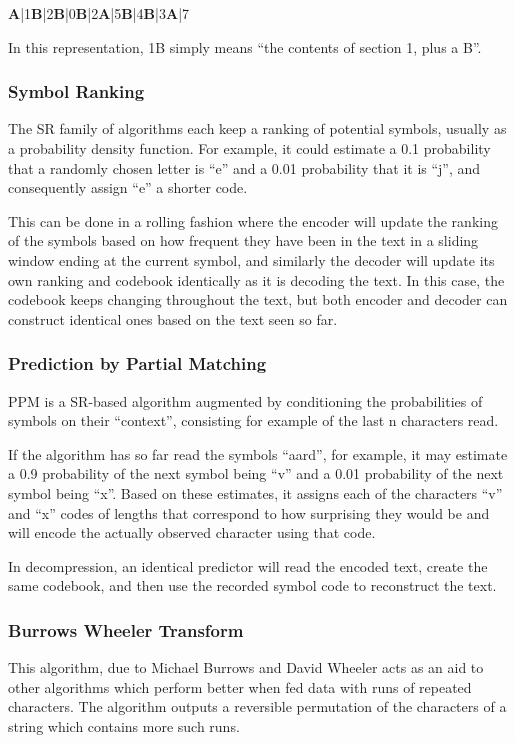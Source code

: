 \begin{center}
\textbf{A}|1\textbf{B}|2\textbf{B}|0\textbf{B}|2\textbf{A}|5\textbf{B}|4\textbf{B}|3\textbf{A}|7
\end{center}

In this representation, 1B simply means “the contents of section 1, plus a B”.


\subsubsection{Symbol Ranking}
The SR family of algorithms each keep a ranking of potential symbols, usually as a probability density function. For example, it could estimate a 0.1 probability that a randomly chosen letter is “e” and a 0.01 probability that it is “j”, and consequently assign “e” a shorter code.

This can be done in a rolling fashion where the encoder will update the ranking of the symbols based on how frequent they have been in the text in a sliding window ending at the current symbol, and similarly the decoder will update its own ranking and codebook identically as it is decoding the text. In this case, the codebook keeps changing throughout the text, but both encoder and decoder can construct identical ones based on the text seen so far. 

\subsubsection{Prediction by Partial Matching}
PPM is a SR-based algorithm augmented by conditioning the probabilities of symbols on their “context”, consisting for example of the last n characters read.

If the algorithm has so far read the symbols “aard”, for example, it may estimate a 0.9 probability of the next symbol being “v” and a 0.01 probability of the next symbol being “x”. Based on these estimates, it assigns each of the characters “v” and “x” codes of lengths that correspond to how surprising they would be and will encode the actually observed character using that code.

In decompression, an identical predictor will read the encoded text, create the same codebook, and then use the recorded symbol code to reconstruct the text. \autocite{Fenwick1998}

\subsubsection{Burrows Wheeler Transform}
This algorithm, due to Michael Burrows and David Wheeler \autocite{Burrows1994} acts as an aid to other algorithms which perform better when fed data with runs of repeated characters. The algorithm outputs a reversible permutation of the characters of a string which contains more such runs.

